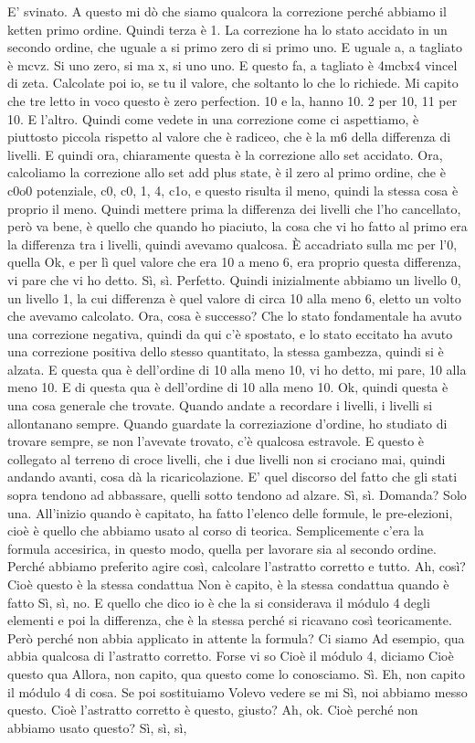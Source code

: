 \begin{soluzione}
   E' svinato. A questo mi dò che siamo qualcora la correzione perché abbiamo il ketten primo ordine. Quindi terza è 1. La correzione ha lo stato accidato in un secondo ordine, che uguale a si primo zero di si primo uno. E uguale a, a tagliato è mcvz. Si uno zero, si ma x, si uno uno. E questo fa, a tagliato è 4mcbx4 vincel di zeta. Calcolate poi io, se tu il valore, che soltanto lo che lo richiede. Mi capito che tre letto in voco questo è zero perfection. 10 e la, hanno 10. 2 per 10, 11 per 10. E l'altro. Quindi come vedete in una correzione come ci aspettiamo, è piuttosto piccola rispetto al valore che è radiceo, che è la m6 della differenza di livelli. E quindi ora, chiaramente questa è la correzione allo set accidato. Ora, calcoliamo la correzione allo set add plus state, è il zero al primo ordine, che è c0o0 potenziale, c0, c0, 1, 4, c1o, e questo risulta il meno, quindi la stessa cosa è proprio il meno. Quindi mettere prima la differenza dei livelli che l'ho cancellato, però va bene, è quello che quando ho piaciuto, la cosa che vi ho fatto al primo era la differenza tra i livelli, quindi avevamo qualcosa. È accadriato sulla mc per l'0, quella Ok, e per lì quel valore che era 10 a meno 6, era proprio questa differenza, vi pare che vi ho detto. Sì, sì. Perfetto. Quindi inizialmente abbiamo un livello 0, un livello 1, la cui differenza è quel valore di circa 10 alla meno 6, eletto un volto che avevamo calcolato. Ora, cosa è successo? Che lo stato fondamentale ha avuto una correzione negativa, quindi da qui c'è spostato, e lo stato eccitato ha avuto una correzione positiva dello stesso quantitato, la stessa gambezza, quindi si è alzata. E questa qua è dell'ordine di 10 alla meno 10, vi ho detto, mi pare, 10 alla meno 10. E di questa qua è dell'ordine di 10 alla meno 10. Ok, quindi questa è una cosa generale che trovate. Quando andate a recordare i livelli, i livelli si allontanano sempre. Quando guardate la correziazione d'ordine, ho studiato di trovare sempre, se non l'avevate trovato, c'è qualcosa estravole. E questo è collegato al terreno di croce livelli, che i due livelli non si crociano mai, quindi andando avanti, cosa dà la ricaricolazione. E' quel discorso del fatto che gli stati sopra tendono ad abbassare, quelli sotto tendono ad alzare. Sì, sì. Domanda? Solo una. All'inizio quando è capitato, ha fatto l'elenco delle formule, le pre-elezioni, cioè è quello che abbiamo usato al corso di teorica. Semplicemente c'era la formula accesirica, in questo modo, quella per lavorare sia al secondo ordine. Perché abbiamo preferito agire così, calcolare l'astratto corretto e tutto. Ah, così? Cioè questo è la stessa condattua Non è capito, è la stessa condattua quando è fatto Sì, sì, no. E quello che dico io è che la si considerava il módulo 4 degli elementi e poi la differenza, che è la stessa perché si ricavano così teoricamente. Però perché non abbia applicato in attente la formula? Ci siamo Ad esempio, qua abbia qualcosa di l'astratto corretto. Forse vi so Cioè il módulo 4, diciamo Cioè questo qua Allora, non capito, qua questo come lo conosciamo. Sì. Eh, non capito il módulo 4 di cosa. Se poi sostituiamo Volevo vedere se mi Sì, noi abbiamo messo questo. Cioè l'astratto corretto è questo, giusto? Ah, ok. Cioè perché non abbiamo usato questo? Sì, sì, sì, 
\end{soluzione}
